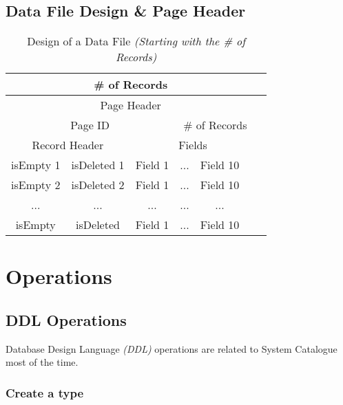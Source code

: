 \documentclass{article}
\newcounter{late}
\begin{document}
    \subsection{Data File Design \& Page Header}
                \begin{table}[h!]
                \begin{center}
                \begin{tabular}{ | c | c | c | c | c | c | c |}
                \hline
                    \multicolumn{6}{|c|}{\# of Records} \\
                \hline
                \hline
                    \multicolumn{6}{|c|}{Page Header} \\
                \hline
                \hline
                    \multicolumn{3}{|c|}{Page ID} &
                    \multicolumn{3}{|c|}{\# of Records} \\
                \hline
                \hline
                    \multicolumn{2}{|c|}{Record Header} &
                    \multicolumn{4}{|c|}{Fields} \\
                \hline
                \hline
                isEmpty 1 & isDeleted 1 & Field 1  & ... & Field 10 \\
                \hline
                isEmpty 2 & isDeleted 2 & Field 1 & ... & Field 10 \\
                \hline
                ... & ... & ... & ...  & ...  \\
                \hline
                isEmpty  & isDeleted  & Field 1  & ... & Field 10 \\
                \hline
                \end{tabular}
            \end{center}
    \caption{Design of a Data File \emph{(Starting with the \# of Records)}}
    \label{table:1}
    \end{table}
    
\newpage
\section{Operations}
    \subsection{DDL Operations}
        Database Design Language \emph{(DDL)} operations are related to System Catalogue most of the time.
        \subsubsection{Create a type}
        
\end{document}
